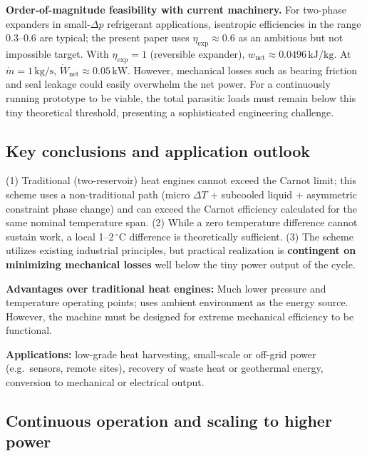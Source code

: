 \documentclass[11pt,a4paper]{article}
\begin{document}
\textbf{Order-of-magnitude feasibility with current machinery.} For two-phase
expanders in small-$\Delta p$ refrigerant applications, isentropic efficiencies
in the range $0.3$--$0.6$ are typical; the present paper uses
$\eta_{\mathrm{exp}} \approx 0.6$ as an ambitious but not impossible target.
With $\eta_{\mathrm{exp}} = 1$ (reversible expander), $w_{\mathrm{net}} \approx 0.0496\,\mathrm{kJ}/\mathrm{kg}$. At $\dot{m} = 1\,\mathrm{kg}/\mathrm{s}$, $\dot{W}_{\mathrm{net}} \approx 0.05\,\mathrm{kW}$.
However, mechanical losses such as bearing friction and seal leakage 
could easily overwhelm the net power. For a continuously running 
prototype to be viable, the total parasitic loads must remain 
below this tiny theoretical threshold, presenting a sophisticated 
engineering challenge.

\subsection{Key conclusions and application outlook}
\label{sec:impl_conclusions}

(1) Traditional (two-reservoir) heat engines cannot exceed the Carnot limit; this scheme uses a
non-traditional path (micro $\Delta T$ + subcooled liquid + asymmetric
constraint phase change) and can exceed the Carnot efficiency calculated for 
the same nominal temperature span. (2) While a zero temperature difference 
cannot sustain work, a local 1--2\,$^\circ$C difference is theoretically 
sufficient. (3) The scheme utilizes existing industrial principles, but 
practical realization is \textbf{contingent on minimizing mechanical 
losses} well below the tiny power output of the cycle.

\textbf{Advantages over traditional heat engines:} Much lower pressure and temperature 
operating points; uses ambient environment as the energy source. However, the machine 
must be designed for extreme mechanical efficiency to be functional.

\textbf{Applications:} low-grade heat harvesting, small-scale or off-grid power
(e.g.\ sensors, remote sites), recovery of waste heat or geothermal energy,
conversion to mechanical or electrical output.

\subsection{Continuous operation and scaling to higher power}
\label{sec:continuous_scaling}
\end{document}

